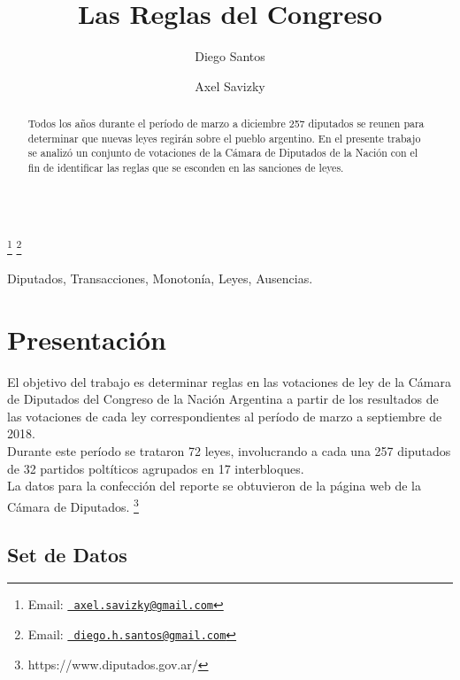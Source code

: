 \documentclass{endm}
\begin{document}
\begin{verbatim}\end{verbatim}\vspace{.5cm}
\begin{frontmatter}
\title{Las Reglas del Congreso}
\author{Diego Santos}
\author{Axel Savizky  }
\address{Reglas de Asociación y Simulación de Patrones - Departamento de Computación - Universidad de Buenos Aires - Bs.As., Argentina}
\thanks[raemail]{Email:
  \href{mailto:axel.savizky@gmail.com} {\texttt{\normalshape
   axel.savizky@gmail.com}}}
\thanks[sdemail]{Email:
  \href{mailto:diego.h.santos@gmail.com} {\texttt{\normalshape
   diego.h.santos@gmail.com}}}
\begin{abstract}
Todos los años durante el período de marzo a diciembre 257 diputados se reunen para determinar que nuevas leyes regirán sobre el pueblo argentino. En el presente trabajo se analizó un conjunto de votaciones de la Cámara de Diputados de la Nación con el fin de identificar las reglas que se esconden en las sanciones de leyes.
\end{abstract}
\begin{keyword}
Diputados, Transacciones, Monotonía, Leyes, Ausencias.
\end{keyword}
\end{frontmatter}
\section{Presentación}\label{intro}
El objetivo del trabajo es determinar reglas en las votaciones de ley de la Cámara de Diputados del Congreso de la Nación Argentina a partir de los resultados de las votaciones de cada ley correspondientes al período de marzo a septiembre de 2018.\\

Durante este período se trataron 72 leyes, involucrando a cada una 257 diputados de 32 partidos poltíticos agrupados en 17 interbloques.\\

La datos para la confección del reporte se obtuvieron de la página web de la Cámara de Diputados. \footnote{https://www.diputados.gov.ar/}

\subsection{Set de Datos}
\end{document}
